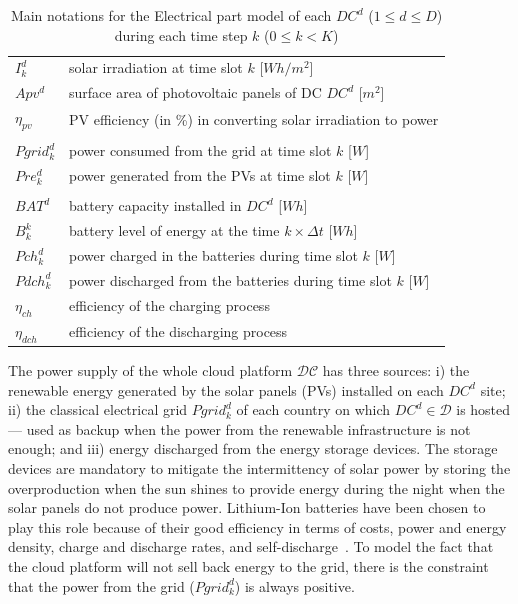 \begin{table}[t]
\caption{Main notations for the Electrical part model of each $DC^d$ ($1\leq d\leq D$) during each time step $k$ ($0\leq k<K$)\label{table:variablesElec}}
\begin{center}
\begin{tabular}{l p{6cm}}
$I^d_k$ & solar irradiation at time slot $k$ [$Wh/m^2$] \\
$Apv^d$ & surface area of photovoltaic panels of DC $DC^d$ [$m^2$] \\ 
$\eta_{pv}$ & PV efficiency (in \%) in converting solar irradiation to power \\
\\
$Pgrid_k^d$ & power consumed from the grid at time slot $k$ [$W$]\\
$Pre_k^d$ & power generated from the PVs at time slot $k$ [$W$] \\
\\
$BAT^d$ & battery capacity installed in $DC^d$ [$Wh$] \\
$B_k^k$ & battery level of energy at the time $k\times\Delta t$ [$Wh$] \\
$Pch_k^d$ & power charged in the batteries during time slot $k$ [$W$]\\
$Pdch_k^d$ & power discharged from the batteries during time slot $k$ [$W$] \\
$\eta_{ch}$ & efficiency of the charging process  \\
$\eta_{dch}$ & efficiency of the discharging process  \\

\end{tabular}
\end{center}
\end{table}

The power supply of the whole cloud platform $\mathcal{DC}$ has three sources: i) the renewable energy generated by the solar panels (PVs) installed on each $DC^d$ site; ii)  the classical electrical grid $Pgrid_k^d$ of each country on which $DC^d\in\mathcal{D}$ is hosted --- used as backup when the power from the renewable infrastructure is not enough; and iii) energy discharged from the energy storage devices. The storage devices are mandatory to mitigate the intermittency of solar power by storing the overproduction when the sun shines to provide energy during the night when the solar panels do not produce power. Lithium-Ion batteries have been chosen to play this role because of their good efficiency in terms of costs, power and energy density, charge and discharge rates, and self-discharge~\cite{wang2012_EDCS}. To model the fact that the cloud platform will not sell back energy to the grid, there is the constraint that the power from the grid ($Pgrid^d_k$) is always positive. 

